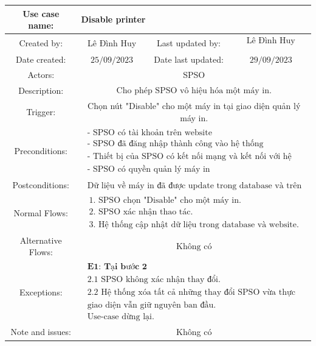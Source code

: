 \begin{tabular}{|c|c|c|c|}
\hline Use case name: & \multicolumn{3}{|l|}{ Disable printer} \\
\hline Created by: & Lê Đình Huy & Last updated by: & $\begin{array}{l}\text { Lê Đình Huy } \\\end{array}$ \\
\hline Date created: & $25 / 09 / 2023$ & Date last updated: & $29 / 09 / 2023$\\
\hline Actors: & \multicolumn{3}{|c|}{ SPSO } \\
\hline Description: & \multicolumn{3}{|c|}{$\begin{array}{l}\text { Cho phép SPSO vô hiệu hóa một máy in. }\end{array}$} \\
\hline Trigger: & \multicolumn{3}{|c|}{ Chọn nút "Disable" cho một máy in tại giao diện quản lý máy in. } \\
\hline Preconditions: & \multicolumn{3}{|c|}{$\begin{array}{l}\text { - SPSO có tài khoản trên website } \\
\text { - SPSO đã đăng nhập thành công vào hệ thống } \\
\text { - Thiết bị của SPSO có kết nối mạng và kết nối với hệ thống }\\
\text { - SPSO có quyền quản lý máy in }\end{array}$} \\
\hline Postconditions: & \multicolumn{3}{|c|}{$\begin{array}{l}\text { Dữ liệu về máy in đã được update trong database và trên giao diện website.} \end{array}$} \\
\hline Normal Flows: & \multicolumn{3}{|c|}{$\begin{array}{l}\text { 1. SPSO chọn "Disable" cho một máy in.} \\
\text { 2. SPSO xác nhận thao tác. } \\
\text { 3. Hệ thống cập nhật dữ liệu trong database và website. }\end{array}$} \\
\hline  Alternative Flows: & \multicolumn{3}{|c|}{$\begin{array}{l} 
\text {Không có}\end{array}$} \\
\hline Exceptions: & \multicolumn{3}{|c|}{$\begin{array}{l}
\textbf { E1: Tại bước 2 } \\
\text { 2.1 SPSO không xác nhận thay đổi.} \\
\text { 2.2 Hệ thống xóa tất cả những thay đổi SPSO vừa thực hiện,} \\
\text { giao diện vẫn giữ nguyên ban đầu.} \\
\text { Use-case dừng lại.} 
\text {}\end{array}$} \\
\hline Note and issues: & \multicolumn{3}{|c|}{ Không có } \\
\hline
\end{tabular}

